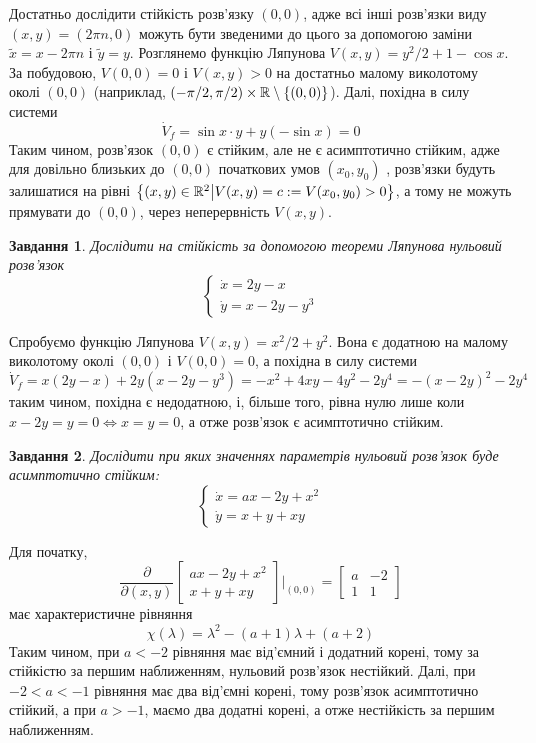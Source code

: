 \documentclass[12pt]{article} %
\newtheorem{prob}{Завдання}
\begin{document}
	Достатньо дослідити
	стійкість розв’язку $(0,0)$, адже всі інші розв’язки виду $(x,y)=(2\pi n,0)$ можуть бути зведеними до цього за допомогою
	заміни $\tilde{x}=x-2\pi n$ і $\tilde{y}=y$.
	Розглянемо функцію Ляпунова $V(x,y)=y^2/2+1-\cos x$. За побудовою, $V(0,0)=0$ і $V(x,y)>0$ на достатньо малому
	виколотому околі $(0,0)$ (наприклад, $(-\pi/2,\pi/2)\times\mathbb{R}\setminus\left\{(0,0)\right\}$). Далі, похідна в силу системи
	\[\dot{V}_f=\sin x\cdot y +y(-\sin x)=0\]
	Таким чином, розв’язок $(0,0)$ є стійким, але не є асимптотично стійким, адже для довільно близьких до $(0,0)$ початкових
	умов $(x_0,y_0)$
	, розв’язки будуть залишатися на рівні $\left\{(x,y)\in\mathbb{R}^2\big| V(x,y)=c:=V(x_0,y_0)>0\right\}$, а тому не можуть прямувати до
	$(0,0)$, через неперервність $V(x,y)$.
\begin{prob}Дослідити на стійкість за допомогою теореми Ляпунова нульовий розв’язок
	\[\begin{cases}\dot{x}=2y-x\\\dot{y}=x-2y-y^3\end{cases}\]\end{prob}
	Спробуємо функцію Ляпунова $V(x,y)=x^2/2+y^2$. Вона є додатною на малому виколотому околі $(0,0)$ і $V(0,0)=0$, а похідна
	в силу системи
	\[\dot{V}_f=x(2y-x)+2y(x-2y-y^3)=-x^2+4xy-4y^2-2y^4=-(x-2y)^2-2y^4\]
	таким чином, похідна є недодатною, і, більше того, рівна нулю лише коли $x-2y=y=0\iff x=y=0$, а отже розв’язок є асимптотично
	стійким.
\begin{prob}Дослідити при яких значеннях параметрів нульовий розв’язок буде асимптотично стійким:
	\[\begin{cases}\dot{x}=ax-2y+x^2\\\dot{y}=x+y+xy\end{cases}\]\end{prob}
	Для початку,
	\[\frac{\partial}{\partial(x,y)}\begin{bmatrix}ax-2y+x^2\\x+y+xy\end{bmatrix}\bigg|_{(0,0)}=\begin{bmatrix}a&-2\\1&1\end{bmatrix}\]
	має характеристичне рівняння 
	\[\chi(\lambda)=\lambda^2-(a+1)\lambda+(a+2)\]
	Таким чином, при $a<-2$ рівняння має від’ємний і додатний корені, тому за стійкістю за першим наближенням, нульовий розв’язок нестійкий.
	Далі, при $-2<a<-1$ рівняння має два від’ємні корені, тому розв’язок асимптотично стійкий, а при $a>-1$, маємо два додатні корені, а отже
	нестійкість за першим наближенням.
\end{document}
